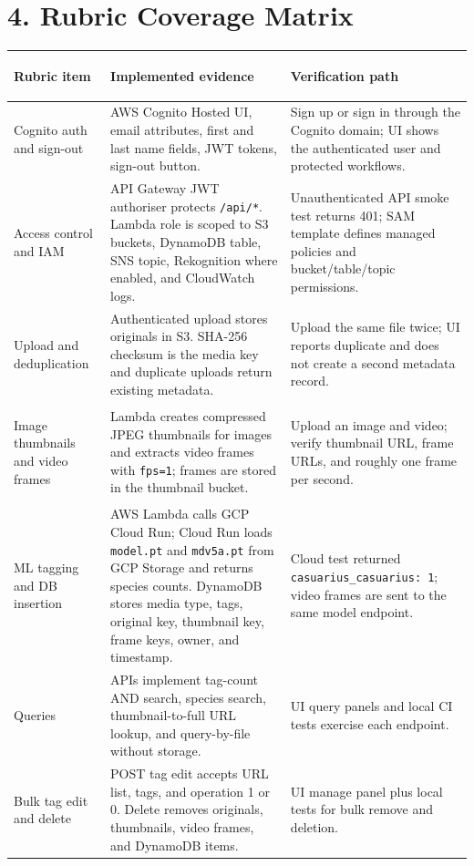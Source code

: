 \documentclass[12pt,a4paper]{article}
\begin{document}
\section*{4. Rubric Coverage Matrix}
\small
\renewcommand{\arraystretch}{1.18}
\begin{tabularx}{\textwidth}{>{\bfseries\raggedright\arraybackslash}p{34mm}>{\raggedright\arraybackslash}p{61mm}X}
\toprule
\textbf{Rubric item} & \textbf{Implemented evidence} & \textbf{Verification path}\\
\midrule
Cognito auth and sign-out & AWS Cognito Hosted UI, email attributes, first and last name fields, JWT tokens, sign-out button. & Sign up or sign in through the Cognito domain; UI shows the authenticated user and protected workflows.\\
Access control and IAM & API Gateway JWT authoriser protects \texttt{/api/*}. Lambda role is scoped to S3 buckets, DynamoDB table, SNS topic, Rekognition where enabled, and CloudWatch logs. & Unauthenticated API smoke test returns 401; SAM template defines managed policies and bucket/table/topic permissions.\\
Upload and deduplication & Authenticated upload stores originals in S3. SHA-256 checksum is the media key and duplicate uploads return existing metadata. & Upload the same file twice; UI reports duplicate and does not create a second metadata record.\\
Image thumbnails and video frames & Lambda creates compressed JPEG thumbnails for images and extracts video frames with \texttt{fps=1}; frames are stored in the thumbnail bucket. & Upload an image and video; verify thumbnail URL, frame URLs, and roughly one frame per second.\\
ML tagging and DB insertion & AWS Lambda calls GCP Cloud Run; Cloud Run loads \texttt{model.pt} and \texttt{mdv5a.pt} from GCP Storage and returns species counts. DynamoDB stores media type, tags, original key, thumbnail key, frame keys, owner, and timestamp. & Cloud test returned \texttt{casuarius\_casuarius: 1}; video frames are sent to the same model endpoint.\\
Queries & APIs implement tag-count AND search, species search, thumbnail-to-full URL lookup, and query-by-file without storage. & UI query panels and local CI tests exercise each endpoint.\\
Bulk tag edit and delete & POST tag edit accepts URL list, tags, and operation 1 or 0. Delete removes originals, thumbnails, video frames, and DynamoDB items. & UI manage panel plus local tests for bulk remove and deletion.\\

\end{tabularx}
\end{document}
